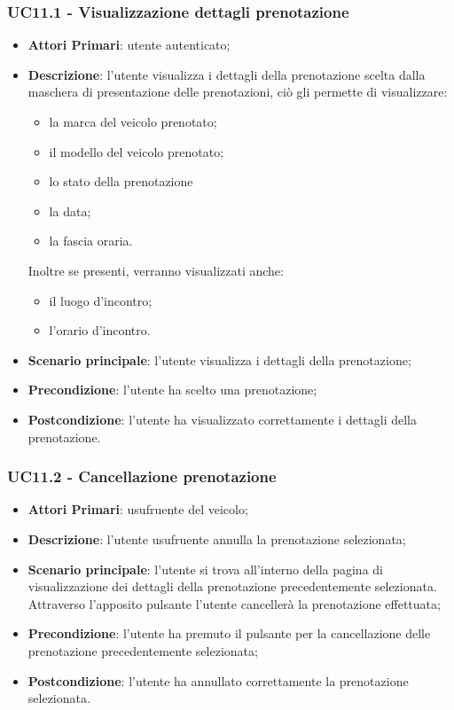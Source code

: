  \subsubsection{UC11.1 - Visualizzazione dettagli prenotazione}
\begin{itemize}
	\item \textbf{Attori Primari}: utente autenticato;
	\item \textbf{Descrizione}: l'utente visualizza i dettagli della prenotazione scelta dalla maschera di presentazione delle prenotazioni, ciò gli permette di visualizzare:
	\begin{itemize}
		\item la marca del veicolo prenotato;
		\item il modello del veicolo prenotato;
		\item lo stato della prenotazione
		\item la data;
		\item la fascia oraria.
	\end{itemize}
	Inoltre se presenti, verranno visualizzati anche:
	\begin{itemize}		
		\item il luogo d'incontro;
		\item l'orario d'incontro.
	\end{itemize}
	\item \textbf{Scenario principale}: l'utente visualizza i dettagli della prenotazione;	
	\item \textbf{Precondizione}: l'utente ha scelto una prenotazione;
	\item \textbf{Postcondizione}: l'utente ha visualizzato correttamente i dettagli della prenotazione.
\end{itemize}
\subsubsection{UC11.2 - Cancellazione prenotazione}
\begin{itemize}
	\item \textbf{Attori Primari}: usufruente del veicolo;
	\item \textbf{Descrizione}: l'utente usufruente annulla la prenotazione selezionata;
	\item \textbf{Scenario principale}: l'utente si trova all'interno della pagina di visualizzazione dei dettagli della prenotazione precedentemente selezionata. Attraverso l'apposito pulsante l'utente cancellerà la prenotazione effettuata;
	\item \textbf{Precondizione}: l'utente ha premuto il pulsante per la cancellazione delle prenotazione precedentemente selezionata;
	\item \textbf{Postcondizione}: l'utente ha annullato correttamente la prenotazione selezionata.
\end{itemize}
